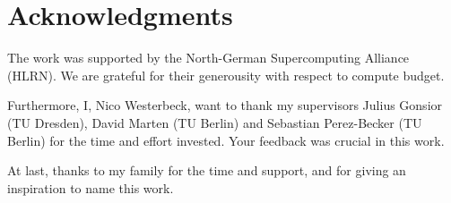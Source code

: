 \section{Acknowledgments}

The work was supported by the North-German Supercomputing Alliance (HLRN). We are grateful for their generousity with respect to compute budget.

Furthermore, I, Nico Westerbeck, want to thank my supervisors Julius Gonsior (TU Dresden), David Marten (TU Berlin) and Sebastian Perez-Becker (TU Berlin) for the time and effort invested. Your feedback was crucial in this work.

At last, thanks to my family for the time and support, and for giving an inspiration to name this work.
